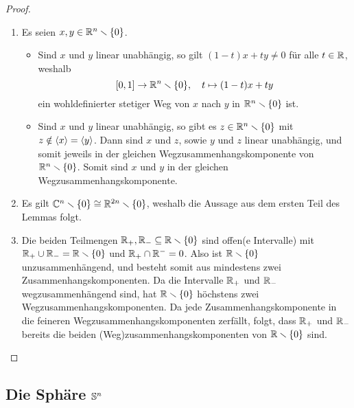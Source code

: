 \begin{proof}
  \begin{enumerate}[label = \alph*)]
    \item
      Es seien $x, y \in \mathbb{R}^n \smallsetminus \{0\}$.
      \begin{itemize}
        \item
          Sind $x$ und $y$ linear unabhängig, so gilt $(1-t) x + t y \neq 0$ für alle $t \in \mathbb{R}$, weshalb
          \[
                    [0,1]
            \to     \mathbb{R}^n \smallsetminus \{0\},
            \quad   t
            \mapsto (1-t) x + t y
          \]
          ein wohldefinierter stetiger Weg von $x$ nach $y$ in $\mathbb{R}^n \smallsetminus \{0\}$ ist.
        \item
          Sind $x$ und $y$ linear unabhängig, so gibt es $z \in \mathbb{R}^n \smallsetminus \{0\}$ mit $z \notin \left\langle x \right\rangle = \left\langle y \right\rangle$.
          Dann sind $x$ und $z$, sowie $y$ und $z$ linear unabhängig, und somit jeweils in der gleichen Wegzusammenhangskomponente von $\mathbb{R}^n \smallsetminus \{0\}$.
          Somit sind $x$ und $y$ in der gleichen Wegzusammenhangskomponente.
      \end{itemize}
      
    \item
      Es gilt $\mathbb{C}^n \smallsetminus \{0\} \cong \mathbb{R}^{2n} \smallsetminus \{0\}$, weshalb die Aussage aus dem ersten Teil des Lemmas folgt.
      
    \item
      Die beiden Teilmengen $\mathbb{R}_+, \mathbb{R}_- \subseteq \mathbb{R} \smallsetminus \{0\}$ sind offen(e Intervalle) mit $\mathbb{R}_+ \cup \mathbb{R}_- = \mathbb{R} \smallsetminus \{0\}$ und $\mathbb{R}_+ \cap \mathbb{R}^- = 0$.
      Also ist $\mathbb{R} \smallsetminus \{0\}$ unzusammenhängend, und besteht somit aus mindestens zwei Zusammenhangskomponenten.
      Da die Intervalle $\mathbb{R}_+$ und $\mathbb{R}_-$ wegzusammenhängend sind, hat $\mathbb{R} \smallsetminus \{0\}$ höchstens zwei Wegzusammenhangskomponenten.
      Da jede Zusammenhangskomponente in die feineren Wegzusammenhangskomponenten zerfällt, folgt, dass $\mathbb{R}_+$ und $\mathbb{R}_-$ bereits die beiden (Weg)zusammenhangskomponenten von $\mathbb{R} \smallsetminus \{0\}$ sind.
    \qedhere
  \end{enumerate}
\end{proof}





\subsection{Die Sphäre \texorpdfstring{$\mathbb{S}^n$}{Sn}}

